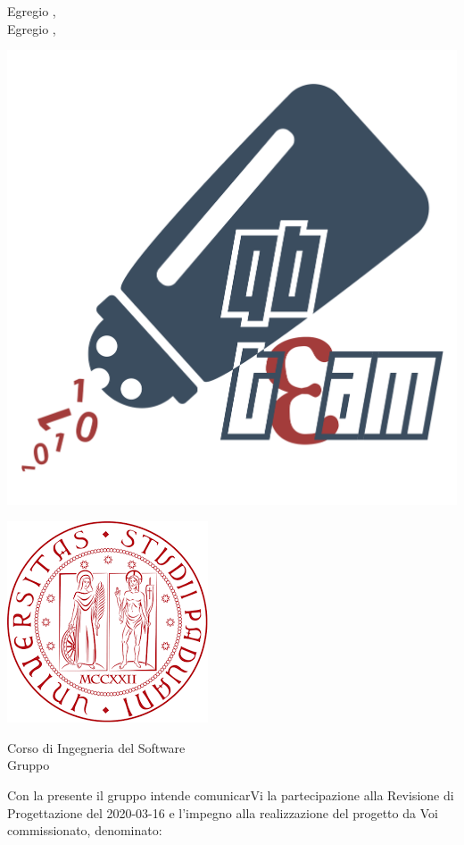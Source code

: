 \documentclass[12pt]{letter}
\begin{document}
    \begin{letter}
        { Egregio \VT{},\\Egregio \CR{},}
        \begin{minipage}{.4\textwidth}
            \begin{flushleft}
                \includegraphics[width=.4\linewidth]{../Utilita/Immagini/qbteam.png}
            \end{flushleft}
        \end{minipage}
        \begin{minipage}{.5\textwidth}
            \begin{flushright}
                \includegraphics[width=.4\linewidth]{../Utilita/Immagini/LogoUniPD.png}
            \end{flushright}
        \end{minipage}
        {    
        \begin{flushleft}
            Corso di Ingegneria del Software\\ Gruppo \Gruppo{}\\ 
        \end{flushleft}
        }
        \opening{ Con la presente il gruppo \Gruppo{} intende comunicarVi la partecipazione alla Revisione di Progettazione del 2020-03-16 e l'impegno alla realizzazione del progetto da Voi commissionato, denominato:}
        \begin{center}
           \textbf{\NomeProgetto{}} 
        \end{center}

\end{letter}
\end{document}
